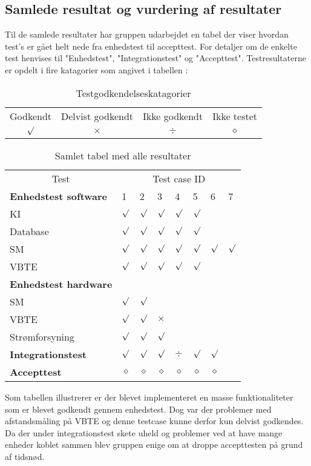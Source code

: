 \subsection{Samlede resultat og vurdering af resultater}
Til de samlede resultater har gruppen udarbejdet en tabel der viser hvordan test's er gået helt nede fra enhedstest til accepttest. For detaljer om de enkelte test henvises til "Enhedstest", "Integrationstest" og "Accepttest". Testresultaterne er opdelt i fire katagorier som angivet i tabellen :
\begin{table}[H]
\centering
\begin{tabular}{cccc}
\hline
Godkendt 	& Delvist godkendt 	& Ikke godkendt & Ikke testet \\
\cmidrule(r){1-1} \cmidrule(r){2-2} \cmidrule(r){3-3} \cmidrule(r){4-4}
$\surd$		& $\times$		& $\div$ & $\diamond$	\\\hline
\end{tabular}
\caption{Testgodkendelseskatagorier}
\end{table}
\begin{table}[H]
\centering
\begin{tabular}{llllllll}
\hline
\multicolumn{1}{c}{Test} & \multicolumn{7}{c}{Test case ID}\\
\cmidrule(r){1-1} \cmidrule(r){2-8} 
\textbf{Enhedstest software} & 1 & 2 & 3 & 4 & 5 & 6 & 7\\
\hline
\phantom{mm}KI  		& $\surd$ & $\surd$ & $\surd$ & $\surd$ & $\surd$ \\
\phantom{mm}Database  	& $\surd$ & $\surd$ & $\surd$ & $\surd$ & $\surd$ \\
\phantom{mm}SM			& $\surd$ & $\surd$ & $\surd$ & $\surd$ & $\surd$ &  $\surd$ & $\surd$\\
\phantom{mm}VBTE  		& $\surd$ & $\surd$ & $\surd$ & $\surd$ & $\surd$ \\ 
\textbf{Enhedstest hardware} \\
\hline
\phantom{mm}SM			& $\surd$ & $\surd$\\
\phantom{mm}VBTE  		& $\surd$ & $\surd$ & $\times$ \\ 
\phantom{mm}Strømforsyning & $\surd$ & $\surd$ & $\surd$\\
\hline
\textbf{Integrationstest} & $\surd$ & $\surd$ & $\surd$ & $\div$ & $\surd$ & $\surd$\\
\textbf{Accepttest} & $\diamond$ & $\diamond$ & $\diamond$ & $\diamond$ & $\diamond$ & $\diamond$\\
\hline
\end{tabular}
\caption{Samlet tabel med alle resultater}
\label{table:alle test samlet}
\end{table}
Som tabellen illustrerer er der blevet implementeret en masse funktionaliteter som er blevet godkendt gennem enhedstest. Dog var der problemer med afstandsmåling på VBTE og denne testcase kunne derfor kun delvist godkendes.\\
Da der under integrationstest skete uheld og problemer ved at have mange enheder koblet sammen blev gruppen enige om at droppe accepttesten på grund af tidsnød.\\